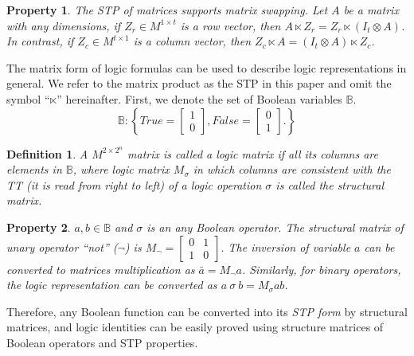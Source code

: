 \documentclass[conference]{IEEEtran}
\newtheorem{owndefinition}{Definition}		%
\newtheorem{ownproperty}{Property} 			%
\begin{document}
\begin{ownproperty}
\label{pro1}
The STP of matrices supports matrix swapping.
Let $A$ be a matrix with any dimensions, if $Z_r \in M^{1 \times t}$ is a row vector, then $A \ltimes Z_r = Z_r \ltimes (I_t \otimes A)$.
In contrast, if $Z_c \in M^{t \times 1}$ is a column vector, then $Z_c \ltimes A = (I_t \otimes A) \ltimes Z_c$.
\end{ownproperty}

The matrix form of logic formulas can be used to describe logic representations in general.
We refer to the matrix product as the STP in this paper and omit the symbol ``$\ltimes$'' hereinafter.
First, we denote the set of Boolean variables $\mathbb{B}$.
\begin{equation}
\label{eq1}
\mathbb{B} : \left\{True = \begin{bmatrix} 1 \\ 0 \end{bmatrix} , False =\begin{bmatrix} 0 \\ 1 \end{bmatrix}. \right\}
\end{equation}

\begin{owndefinition}
\label{def2}
A $M^{2 \times 2^n}$ matrix is called a logic matrix if all its columns are elements in $\mathbb{B}$, where logic matrix $M_{\sigma}$ in which columns are consistent with the TT (it is read from right to left) of a logic operation $\sigma$ is called the structural matrix.
\end{owndefinition}

\begin{ownproperty}
\label{pro2}
$a, b \in \mathbb{B}$ and $\sigma$ is an any Boolean operator.
The structural matrix of unary operator ``\emph{not}'' ($\lnot$) is $M_{\lnot} = \begin{bmatrix} 0 & 1 \\ 1 & 0 \end{bmatrix}$.
The inversion of variable $a$ can be converted to matrices multiplication as $\bar{a} = M_\lnot a$.
Similarly, for binary operators, the logic representation can be converted as $a\ \sigma\ b = M_{\sigma} ab$.
\end{ownproperty}

Therefore, any Boolean function can be converted into its \emph{STP form} by structural matrices, and logic identities can be easily proved using structure matrices of Boolean operators and STP properties.
\end{document}
